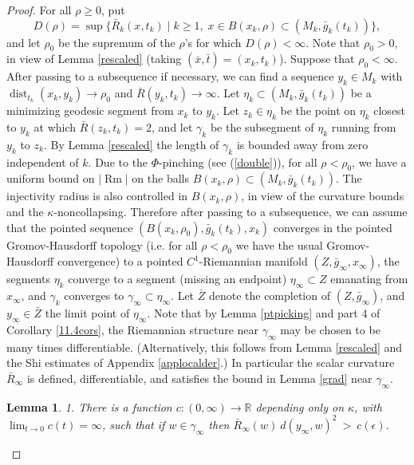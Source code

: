 \documentclass[12pt]{amsart}
\newcommand{\dist}{\operatorname{dist}}
\newcommand{\R}{{\mathbb R}}
\newcommand{\Rm}{\operatorname{Rm}}
\newcommand{\eps}{\epsilon}
\newcommand{\ga}{\gamma}
\newcommand{\ra}{\rightarrow}
\numberwithin{equation}{section}
\theoremstyle{plain}
\newtheorem{lemma}[equation]{Lemma}
\theoremstyle{definition}
\theoremstyle{remark}
\begin{document}
\begin{proof}
For all $\rho\geq 0$, put 
\begin{equation}
D(\rho) = \sup\{\bar R_k(x,t_k)\mid k\geq 1,\;x\in B(x_k,\rho)\subset
(M_k,\bar g_k(t_k))\},
\end{equation}
and let $\rho_0$ be the supremum of the $\rho$'s for which
$D(\rho)<\infty$.  Note that $\rho_0>0$, in view of Lemma \ref{rescaled}
(taking $(\bar x,\bar t)=(x_k,t_k)$).
Suppose that $\rho_0<\infty$.         
After passing to a subsequence if necessary, we can find
a sequence $y_k\in M_k$ with $\dist_{t_k}(x_k,y_k) \rightarrow \rho_0$
and $\bar R(y_k,t_k)\ra\infty$.    Let $\eta_k\subset (M_k,\bar g_k(t_k))$
be a minimizing geodesic segment from $x_k$ to $y_k$. 
Let $z_k\in \eta_k$ be the point on $\eta_k$ closest to $y_k$
at which $\bar R(z_k,t_k)=2$, and let $\ga_k$
be the subsegment of $\eta_k$ running from $y_k$ to $z_k$.  By
Lemma \ref{rescaled} the length of $\ga_k$ is bounded away from zero
independent of $k$.  Due to the $\Phi$-pinching
(see (\ref{double})),
for all $\rho<\rho_0$, we have a uniform bound on $|\Rm|$
on the balls $B(x_k,\rho)\subset (M_k,\bar g_k(t_k))$.  The 
injectivity radius is also controlled in $B(x_k,\rho)$, 
in view of the curvature bounds and the $\kappa$-noncollapsing.
Therefore after passing
to a subsequence, we can assume that the pointed sequence 
$(B(x_k,\rho_0),\bar g_k(t_k),x_k)$ converges in the pointed 
Gromov-Hausdorff topology (i.e. for all $\rho<\rho_0$ we have the 
usual Gromov-Hausdorff convergence) to a pointed $C^1$-Riemannian manifold 
$(Z,\bar g_\infty,x_\infty)$,  the segments $\eta_k$ converge to a  segment (missing
an endpoint)
$\eta_\infty\subset Z$ emanating from $x_\infty$, and $\gamma_k$
converges to  $\ga_\infty\subset\eta_\infty$.  Let $\bar Z$
denote the completion of $(Z,\bar g_\infty)$, and $y_\infty\in \bar Z$
the limit point of $\eta_\infty$.    Note that by
Lemma \ref{ptpicking} and
part 4 of Corollary \ref{11.4cors}, the Riemannian structure near
$\ga_\infty$ may be chosen to be many times differentiable.
(Alternatively, this follows from Lemma \ref{rescaled} and the Shi
estimates of Appendix \ref{applocalder}.)
In particular
the scalar curvature $\bar R_\infty$ is defined, differentiable,
and satisfies the bound in Lemma \ref{grad} near $\ga_\infty$.

\begin{lemma}
\label{nearlyround}
1. There is a function $c:(0,\infty)\ra \R$ depending only
on $\kappa$, with
$\lim_{t\ra 0}c(t)=\infty$, such that if $w\in\ga_\infty$ then
$\bar R_\infty(w) \: d(y_\infty,w)^2 \: > \: c(\eps)$.


\end{lemma}
\end{proof}
\end{document}
